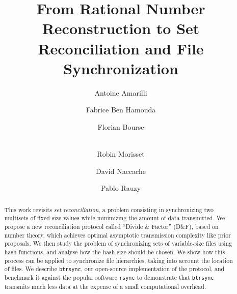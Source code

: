 \documentclass{llncs}
\newcommand{\df}{D\&F\xspace}
\newcommand{\btrsync}{\texttt{btrsync}\xspace}
\newcommand{\rsync}{\texttt{rsync}\xspace}
\begin{document}
\title{From Rational Number Reconstruction to Set Reconciliation and File
Synchronization}

\author{Antoine Amarilli \and Fabrice Ben Hamouda \and Florian Bourse \and\\
Robin Morisset \and David Naccache \and Pablo Rauzy}


\maketitle

\begin{abstract}
  This work revisits \textit{set reconciliation}, a problem consisting in synchronizing two multisets of fixed-size values while minimizing the amount of data transmitted. We propose a new reconciliation protocol called ``Divide \& Factor'' (\df), based on number theory, which achieves optimal asymptotic transmission complexity like prior proposals. We then study the problem of synchronizing sets of variable-size files using hash functions, and analyse how the hash size should be chosen. We show how this process can be applied to synchronize file hierarchies, taking into account the location of files. We describe \btrsync, our open-source implementation of the protocol, and benchmark it against the popular software \rsync to demonstrate that \btrsync transmits much less data at the expense of a small computational overhead.
\end{abstract}

%
\end{document}
